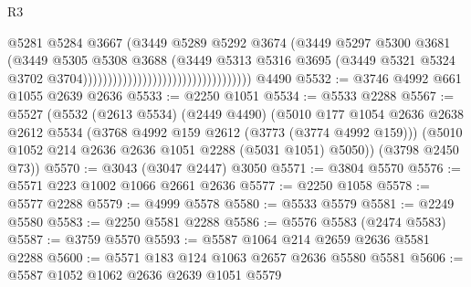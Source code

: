 \begin{lexlean}{R3}
\begin{coremodule}
                                                              @5281
                                                              @5284
                                                              @3667
                                                              (@3449
                                                                @5289
                                                                @5292
                                                                @3674
                                                                (@3449
                                                                  @5297
                                                                  @5300
                                                                  @3681
                                                                  (@3449
                                                                    @5305
                                                                    @5308
                                                                    @3688
                                                                    (@3449
                                                                      @5313
                                                                      @5316
                                                                      @3695
                                                                      (@3449
                                                                        @5321
                                                                        @5324
                                                                        @3702
                                                                        @3704))))))))))))))))))))))))))))))))))
    @4490
@5532 := @3746 @4992 @661 @1055 @2639 @2636
@5533 := @2250 @1051
@5534 := @5533 @2288
@5567 := @5527
    (@5532
      (@2613 @5534)
      (@2449 @4490)
      (@5010
        @177
        @1054
        @2636
        @2638
        @2612
        @5534
        (@3768 @4992 @159 @2612 (@3773 (@3774 @4992 @159)))
        (@5010 @1052 @214 @2636 @2636 @1051 @2288 (@5031 @1051) @5050))
      (@3798 @2450 @73))
@5570 := @3043 (@3047 @2447) @3050
@5571 := @3804 @5570
@5576 := @5571 @223 @1002 @1066 @2661 @2636
@5577 := @2250 @1058
@5578 := @5577 @2288
@5579 := @4999 @5578
@5580 := @5533 @5579
@5581 := @2249 @5580
@5583 := @2250 @5581 @2288
@5586 := @5576 @5583 (@2474 @5583)
@5587 := @3759 @5570
@5593 := @5587 @1064 @214 @2659 @2636 @5581 @2288
@5600 := @5571 @183 @124 @1063 @2657 @2636 @5580 @5581
@5606 := @5587 @1052 @1062 @2636 @2639 @1051 @5579

\end{coremodule}
\end{lexlean}
